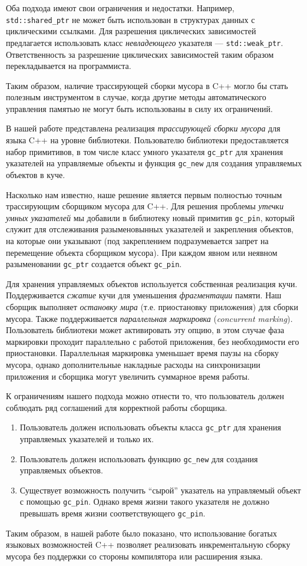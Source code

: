 \documentclass[10pt]{article}
\newcommand{\code}{\texttt}
\begin{document}
Оба подхода имеют свои ограничения и недостатки. 
Например, \\\code{std::shared\_ptr} не может быть использован 
в структурах данных с циклическими ссылками.
Для разрешения циклических зависимостей предлагается использовать  
класс \emph{невладеющего} указателя --- \code{std::weak\_ptr}.
Ответственность за разрешение циклических зависимостей 
таким образом перекладывается на программиста. 

Таким образом, наличие трассирующей сборки мусора в C++
могло бы стать полезным инструментом в случае, 
когда другие методы автоматического управления памятью 
не могут быть использованы в силу их ограничений.

В нашей работе представлена реализация \emph{трассирующей сборки мусора} 
для языка C++ на уровне библиотеки. 
Пользователю библиотеки предоставляется набор примитивов, 
в том числе класс умного указателя \code{gc\_ptr} для хранения
указателей на управляемые объекты и 
функция \code{gc\_new} для создания управляемых объектов в куче.

Насколько нам известно, наше решение является первым
полностью точным трассирующим сборщиком мусора для C++.
Для решения проблемы \emph{утечки умных указателей}
мы добавили в библиотеку новый примитив \code{gc\_pin},
который служит для отслеживания разыменовынных указателей
и закрепления объектов, на которые они указывают 
(под закреплением подразумевается запрет на перемещение объекта 
сборщиком мусора). При каждом явном или неявном разыменовании \code{gc\_ptr}
создается объект \code{gc\_pin}. 

Для хранения управляемых объектов используется собственная реализация кучи.
Поддерживается \emph{сжатие} кучи для уменьшения \emph{фрагментации} памяти.
Наш сборщик выполняет \emph{остановку мира} (т.е. приостановку приложения)
для сборки мусора. 
Также поддерживается \emph{параллельная маркировка} (\emph{concurrent marking}).
Пользователь библиотеки может активировать эту опцию,
в этом случае фаза маркировки проходит параллельно с работой приложения, 
без необходимости его приостановки. 
Параллельная маркировка уменьшает время паузы на сборку мусора, 
однако дополнительные накладные расходы на синхронизации приложения и сборщика
могут увеличить суммарное время работы.

К ограничениям нашего подхода можно отнести то,
что пользователь должен соблюдать ряд соглашений для корректной работы сборщика.

\begin{enumerate}
\item Пользователь должен использовать объекты класса \code{gc\_ptr} для хранения управляемых указателей и только их.
\item Пользователь должен использовать функцию \code{gc\_new} для создания управляемых объектов.
\item Существует возможность получить ``сырой'' указатель на управляемый объект с помощью \code{gc\_pin}. 
      Однако время жизни такого указателя не должно превышать время жизни соответствующего \code{gc\_pin}.
\end{enumerate}

Таким образом, в нашей работе было показано, 
что использование богатых языковых возможностей C++ 
позволяет реализовать инкрементальную сборку мусора 
без поддержки со стороны компилятора или расширения языка.

\end{document}
